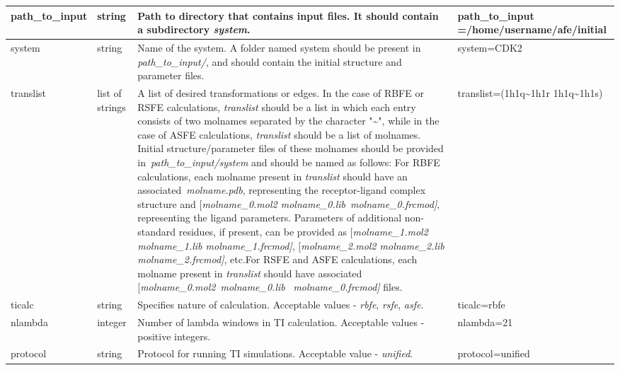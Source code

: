 \documentclass[11pt,letterpaper,titlepage]{article}
\begin{document}
\begin{footnotesize}
\begin{landscape}
\begin{center}
\begin{longtable}[1]{p{3cm}|p{0.5cm}|p{11cm}|p{4cm}}
path\_to\_input    & string          & Path to directory that contains input files. It should contain a subdirectory \textit{system}.  & path\_to\_input =/home/username/afe/initial                       \\ 
\hline
system             & string          & Name of the system. A folder named system should be present in \textit{path\_to\_input/}, and should contain the initial structure and parameter files.      & system=CDK2             \\ 
\hline
translist          & list of strings & A list of desired transformations or edges. In the case of RBFE or RSFE calculations, \textit{translist} should be a list in which each entry consists of two molnames separated by the character "\textasciitilde{}", while in the case of ASFE calculations, \textit{translist} should be a list of molnames. Initial structure/parameter files of these molnames should be provided in~\textit{path\_to\_input/system }and should be named as follows:  \newline For RBFE calculations, each molname present in \textit{translist} should have an associated~\textit{molname.pdb}, representing the receptor-ligand complex structure and [\textit{molname\_0.mol2 molname\_0.lib}~\textit{molname\_0.frcmod]}, representing the ligand parameters. Parameters of additional non-standard residues, if present, can be provided as [\textit{molname\_1.mol2 molname\_1.lib molname\_1.frcmod]}, [\textit{molname\_2.mol2 molname\_2.lib molname\_2.frcmod]}, etc.\newline For RSFE and ASFE calculations, each molname present in \textit{translist} should have associated [\textit{molname\_0.mol2}~\textit{molname\_0.lib}~ \textit{molname\_0.frcmod] }files. & translist=(1h1q\textasciitilde{}1h1r 1h1q\textasciitilde{}1h1s)  \\ 
\hline
ticalc             & string          & Specifies nature of calculation. Acceptable values - \textit{rbfe}, \textit{rsfe}, \textit{asfe}.   & ticalc=rbfe  \\ 
\hline
nlambda            & integer         & Number of lambda windows in TI calculation. Acceptable values - positive integers.   & nlambda=21   \\ 
\hline
protocol           & string          & Protocol for running TI simulations. Acceptable value - \textit{unified}.     & protocol=unified     \\ 
\hline

\end{longtable}
\end{center}
\end{landscape}
\end{footnotesize}
\end{document}
